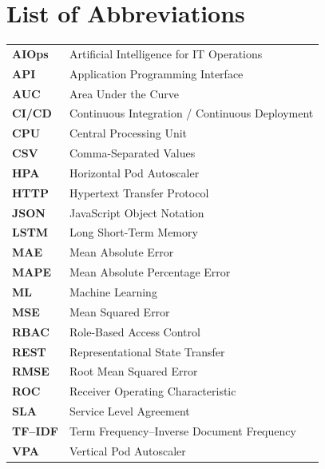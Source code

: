 \chapter*{List of Abbreviations}
\begin{tabular}{ll}
\textbf{AIOps} & Artificial Intelligence for IT Operations \\
\textbf{API} & Application Programming Interface \\
\textbf{AUC} & Area Under the Curve \\
\textbf{CI/CD} & Continuous Integration / Continuous Deployment \\
\textbf{CPU} & Central Processing Unit \\
\textbf{CSV} & Comma-Separated Values \\
\textbf{HPA} & Horizontal Pod Autoscaler \\
\textbf{HTTP} & Hypertext Transfer Protocol \\
\textbf{JSON} & JavaScript Object Notation \\
\textbf{LSTM} & Long Short-Term Memory \\
\textbf{MAE} & Mean Absolute Error \\
\textbf{MAPE} & Mean Absolute Percentage Error \\
\textbf{ML} & Machine Learning \\
\textbf{MSE} & Mean Squared Error \\
\textbf{RBAC} & Role-Based Access Control \\
\textbf{REST} & Representational State Transfer \\
\textbf{RMSE} & Root Mean Squared Error \\
\textbf{ROC} & Receiver Operating Characteristic \\
\textbf{SLA} & Service Level Agreement \\
\textbf{TF--IDF} & Term Frequency--Inverse Document Frequency \\
\textbf{VPA} & Vertical Pod Autoscaler \\
\end{tabular}
